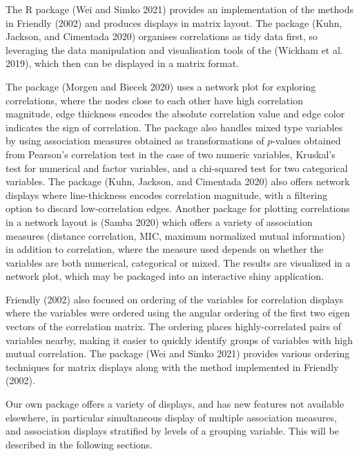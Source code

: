 The R package  (Wei and Simko 2021) provides an implementation of the methods in Friendly (2002) and produces displays in matrix layout. The package  (Kuhn, Jackson, and Cimentada 2020) organises correlations as tidy data first, so leveraging the data manipulation and visualisation tools of the  (Wickham et al. 2019), which then can be displayed in a matrix format.

The package  (Morgen and Biecek 2020) uses a network plot for exploring correlations, where the nodes close to each other have high correlation magnitude, edge thickness encodes the absolute correlation value and edge color indicates the sign of correlation. The package also handles mixed type variables by using association measures obtained as transformations of \(p\)-values obtained from
Pearson's correlation test in the case of two numeric variables, Kruskal's test for numerical and factor variables, and a chi-squared test for two categorical variables. The package  (Kuhn, Jackson, and Cimentada 2020) also offers network displays where line-thickness encodes correlation magnitude, with a filtering option to discard low-correlation edges. Another package for plotting correlations in a network layout is  (Samba 2020) which offers a variety of association measures (distance correlation, MIC, maximum normalized mutual information) in addition to correlation, where the measure used depends on whether the variables are both numerical, categorical or mixed. The results are visualized in a network plot, which may be packaged into an interactive shiny application.

Friendly (2002) also focused on ordering of the variables for correlation displays where the variables were ordered using the angular ordering of the first two eigen vectors of the correlation matrix. The ordering places highly-correlated pairs of variables nearby, making it easier to quickly identify groups of variables with high mutual correlation. The package  (Wei and Simko 2021) provides various ordering techniques for matrix displays along with the method implemented in Friendly (2002).

Our own package  offers a variety of displays, and has new features not available elsewhere, in particular simultaneous display of multiple association measures, and association displays stratified by levels of a grouping variable. This will be described in the following sections.


